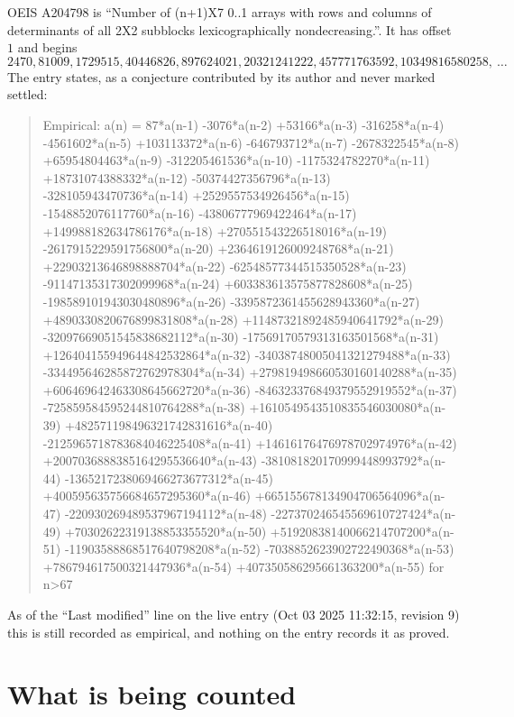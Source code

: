 \documentclass[11pt,a4paper]{article}
\theoremstyle{plain}
\theoremstyle{definition}
\begin{document}
OEIS A204798 is ``Number of (n+1)X7 0..1 arrays with rows and columns of determinants of all 2X2 subblocks lexicographically nondecreasing.''. It has offset $1$ and begins
\[
2470, 81009, 1729515, 40446826, 897624021, 20321241222, 457771763592, 10349816580258,\ \dots
\]
The entry states, as a conjecture contributed by its author and never marked settled:
\begin{quote}
Empirical: a(n) = 87*a(n-1) -3076*a(n-2) +53166*a(n-3) -316258*a(n-4) -4561602*a(n-5) +103113372*a(n-6) -646793712*a(n-7) -2678322545*a(n-8) +65954804463*a(n-9) -312205461536*a(n-10) -1175324782270*a(n-11) +18731074388332*a(n-12) -50374427356796*a(n-13) -328105943470736*a(n-14) +2529557534926456*a(n-15) -1548852076117760*a(n-16) -43806777969422464*a(n-17) +149988182634786176*a(n-18) +270551543226518016*a(n-19) -2617915229591756800*a(n-20) +2364619126009248768*a(n-21) +22903213646898888704*a(n-22) -62548577344515350528*a(n-23) -91147135317302099968*a(n-24) +603383613575877828608*a(n-25) -198589101943030480896*a(n-26) -3395872361455628943360*a(n-27) +4890330820676899831808*a(n-28) +11487321892485940641792*a(n-29) -32097669051545838682112*a(n-30) -17569170579313163501568*a(n-31) +126404155949644842532864*a(n-32) -34038748005041321279488*a(n-33) -334495646285872762978304*a(n-34) +279819498660530160140288*a(n-35) +606469642463308645662720*a(n-36) -846323376849379552919552*a(n-37) -725859584595244810764288*a(n-38) +1610549543510835546030080*a(n-39) +482571198496321742831616*a(n-40) -2125965718783684046225408*a(n-41) +14616176476978702974976*a(n-42) +2007036888385164295536640*a(n-43) -381081820170999448993792*a(n-44) -1365217238069466273677312*a(n-45) +400595635756684657295360*a(n-46) +665155678134904706564096*a(n-47) -220930269489537967194112*a(n-48) -227370246545569610727424*a(n-49) +70302622319138853355520*a(n-50) +51920838140066214707200*a(n-51) -11903588868517640798208*a(n-52) -7038852623902722490368*a(n-53) +786794617500321447936*a(n-54) +407350586295661363200*a(n-55) for n>67
\end{quote}
As of the ``Last modified'' line on the live entry (Oct 03 2025 11:32:15, revision 9) this is still
recorded as empirical, and nothing on the entry records it as proved.

\section{What is being counted}
\end{document}
